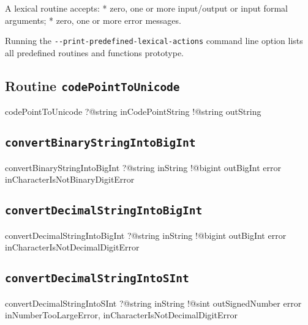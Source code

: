 A lexical routine accepts:
  * zero, one or more input/output or input formal arguments;
  * zero, one or more error messages.

Running the \texttt{-{}-print-predefined-lexical-actions} command line option lists all predefined routines and functions prototype.

\subsection{Routine \texttt{codePointToUnicode}}

\begin{galgas3}
codePointToUnicode ?@string inCodePointString
                   !@string outString
\end{galgas3}

\subsection{\texttt{convertBinaryStringIntoBigInt}}

\begin{galgas3}
convertBinaryStringIntoBigInt ?@string inString
                              !@bigint outBigInt
                              error inCharacterIsNotBinaryDigitError
\end{galgas3}


\subsection{\texttt{convertDecimalStringIntoBigInt}}

\begin{galgas3}
convertDecimalStringIntoBigInt ?@string inString
                               !@bigint outBigInt
                               error inCharacterIsNotDecimalDigitError
\end{galgas3}


\subsection{\texttt{convertDecimalStringIntoSInt}}

\begin{galgas3}
convertDecimalStringIntoSInt ?@string inString
                             !@sint outSignedNumber
                             error inNumberTooLargeError,
                                   inCharacterIsNotDecimalDigitError
\end{galgas3}

